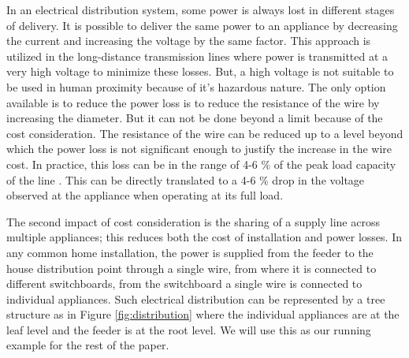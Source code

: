 In an electrical distribution system, some power is always lost in different stages of delivery.
It is possible to deliver the same power to an appliance by decreasing the current and increasing the voltage by the same factor. This approach is utilized in the long-distance transmission lines where power is transmitted at a very high voltage to minimize these losses. But, a high voltage is not suitable to be used in human proximity because of it's hazardous nature. The only option available is to reduce the power loss is to reduce the resistance of the wire by increasing the diameter.
But it can not be done beyond a limit because of the cost consideration. The resistance of the wire can be reduced up to a level beyond which the power loss is not significant enough to justify the increase in the wire cost. In practice, this loss can be in the range of 4-6 \% of the peak load capacity of the line \cite{ElectricalWireGauges}. This can be directly translated to a 4-6 \% drop in the voltage observed at the appliance when operating at its full load.

The second impact of cost consideration is the sharing of a supply line across multiple appliances; this reduces both the cost of installation and power losses. In any common home installation, the power is supplied from the feeder to the house distribution point through a single wire, from where it is connected to different switchboards, from the switchboard a single wire is connected to individual appliances. Such electrical distribution can be represented by a tree structure as in Figure \ref{fig:distribution} where the individual appliances are at the leaf level and the feeder is at the root level.
We will use this as our running example for the rest of the paper.
